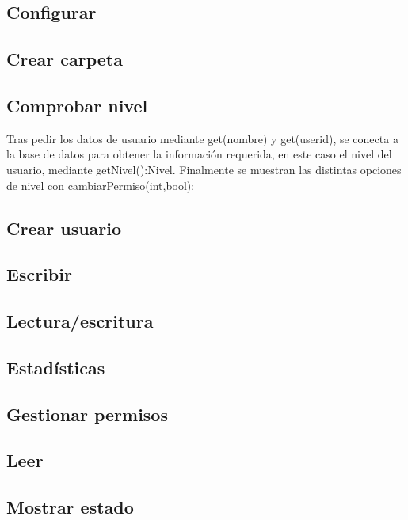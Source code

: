 \subsection{Configurar}
\subsection{Crear carpeta}
\subsection{Comprobar nivel}Tras pedir los datos de usuario mediante get(nombre) y get(userid), se conecta a la base de datos para obtener la información requerida, en este caso el nivel del usuario, mediante getNivel():Nivel. Finalmente se muestran las distintas opciones de nivel con cambiarPermiso(int,bool);
\subsection{Crear usuario}
\subsection{Escribir}
\subsection{Lectura/escritura}
\subsection{Estadísticas}
\subsection{Gestionar permisos}
\subsection{Leer}
\subsection{Mostrar estado}


